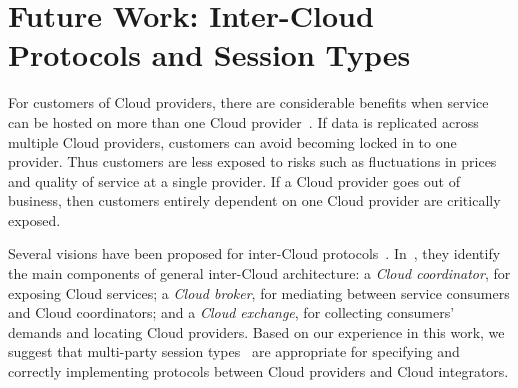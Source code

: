 \documentclass[10pt]{llncs}
\begin{document}


\section{Future Work: Inter-Cloud Protocols and Session Types}
\label{sect:highlights}

For customers of Cloud providers, there are considerable benefits when service can be hosted on more than one Cloud provider~\cite{Buyya2009,intercloud,Armbrust2010}.
If data is replicated across multiple Cloud providers, customers can avoid becoming locked in to one provider. Thus customers are less exposed to risks such as fluctuations in prices and quality of service at a single provider. If a Cloud provider goes out of business, then customers entirely dependent on one Cloud provider are critically exposed.

Several visions have been proposed for inter-Cloud protocols~\cite{xmpp-intercloud-transport,cloud-integrator}. In~\cite{utility-driven-fed}, they identify the main components of general inter-Cloud architecture:
a \textit{Cloud coordinator}, for exposing Cloud services;
a \textit{Cloud broker}, for mediating between service consumers and Cloud coordinators;
and a \textit{Cloud exchange}, for collecting consumers' demands and locating Cloud providers. %
%
Based on our experience in this work, we suggest that multi-party session types~\cite{ng2012multiparty} are appropriate for specifying and correctly implementing protocols between Cloud providers and Cloud integrators.
\end{document}
